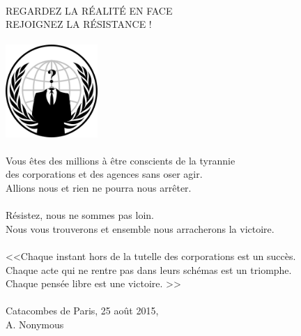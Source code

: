\documentclass[11pt,twoside,a4paper]{article}
\begin{document}
\begin{center}
\begin{bfseries}
\begin{scshape}
~\\

\textcolor{titlered}{\LARGE REGARDEZ LA R{\'E}ALIT{\'E} EN FACE ~\\
REJOIGNEZ LA R{\'E}SISTANCE ! }~\\

~\\

\includegraphics[width=3.50cm]{img/anonymous_emblem.png}~\\

~\\

Vous {\^e}tes des millions {\`a} {\^e}tre conscients de la tyrannie ~\\
des corporations et des agences sans oser agir. ~\\
Allions nous et rien ne pourra nous arr{\^e}ter.~\\

~\\

R{\'e}sistez, nous ne sommes pas loin. ~\\
Nous vous trouverons et ensemble nous arracherons la victoire.~\\

~\\

<<\textcolor{titlered}{Chaque instant hors de la tutelle des corporations est un succ{\`e}s. ~\\
Chaque acte qui ne rentre pas dans leurs sch{\'e}mas est un triomphe. ~\\
Chaque pens{\'e}e libre est une victoire. }>>~\\

~\\

Catacombes de Paris, 25 ao{\^u}t 2015, ~\\
A. Nonymous~\\


\end{scshape} \end{bfseries} \end{center}
\end{document}
